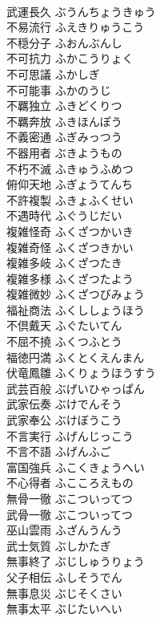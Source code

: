 \documentclass[8pt]{extreport}
\begin{document}
\begin{CJK}{UTF8}{min}
\\	武運長久	ぶうんちょうきゅう	
\\	不易流行	ふえきりゅうこう	
\\	不穏分子	ふおんぶんし	
\\	不可抗力	ふかこうりょく	
\\	不可思議	ふかしぎ	
\\	不可能事	ふかのうじ	
\\	不羈独立	ふきどくりつ	
\\	不羈奔放	ふきほんぽう	
\\	不義密通	ふぎみっつう	
\\	不器用者	ぶきようもの	
\\	不朽不滅	ふきゅうふめつ	
\\	俯仰天地	ふぎょうてんち	
\\	不許複製	ふきょふくせい	
\\	不遇時代	ふぐうじだい	
\\	複雑怪奇	ふくざつかいき	
\\	複雑奇怪	ふくざつきかい	
\\	複雑多岐	ふくざつたき	
\\	複雑多様	ふくざつたよう	
\\	複雑微妙	ふくざつびみょう	
\\	福祉商法	ふくししょうほう	
\\	不倶戴天	ふぐたいてん	
\\	不屈不撓	ふくつふとう	
\\	福徳円満	ふくとくえんまん	
\\	伏竜鳳雛	ふくりょうほうすう	
\\	武芸百般	ぶげいひゃっぱん	
\\	武家伝奏	ぶけでんそう	
\\	武家奉公	ぶけぼうこう	
\\	不言実行	ふげんじっこう	
\\	不言不語	ふげんふご	
\\	富国強兵	ふこくきょうへい	
\\	不心得者	ふこころえもの	
\\	無骨一徹	ぶこついってつ	
\\	武骨一徹	ぶこついってつ	
\\	巫山雲雨	ふざんうんう	
\\	武士気質	ぶしかたぎ	
\\	無事終了	ぶじしゅうりょう	
\\	父子相伝	ふしそうでん	
\\	無事息災	ぶじそくさい	
\\	無事太平	ぶじたいへい	

\end{CJK}
\end{document}
